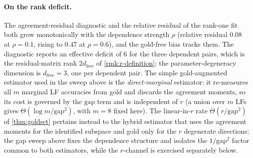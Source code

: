 \paragraph{On the rank deficit.} The agreement-residual diagnostic and
the relative residual of the rank-one fit both grow monotonically with
the dependence strength $\rho$ (relative residual $0.08$ at $\rho =
0.1$, rising to $0.47$ at $\rho = 0.6$), and the gold-free bias tracks
them. The diagnostic reports an effective deficit of $6$ for the three
dependent pairs, which is the residual-matrix rank $2 d_{\mathrm{free}}$
of \cref{rmk:r-definition}; the parameter-degeneracy dimension is
$d_{\mathrm{free}} = 3$, one per dependent pair. The simple
gold-augmented estimator used in the sweep above is the
\emph{direct-marginal} estimator: it re-measures all $m$ marginal LF
accuracies from gold and discards the agreement moments, so its cost is
governed by the $\mathrm{gap}$ term and is independent of $r$ (a union
over $m$ LFs gives $\Theta(\log m/\mathrm{gap}^2)$, with $m = 8$ fixed
here). The linear-in-$r$ rate $\Theta(r/\mathrm{gap}^2)$ of
\cref{thm:goldset} pertains instead to the hybrid estimator that uses
the agreement moments for the identified subspace and gold only for the
$r$ degenerate directions; the gap sweep above fixes the dependence
structure and isolates the $1/\mathrm{gap}^2$ factor common to both
estimators, while the $r$-channel is exercised separately below.

